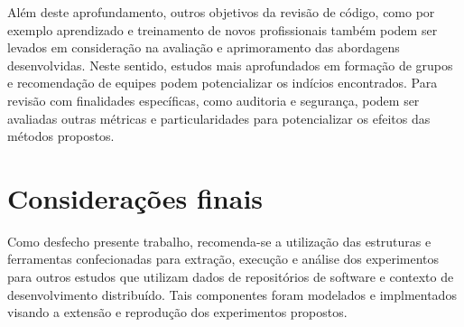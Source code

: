 \documentclass[12pt,openany,oneside,a4paper,english,brazil]{abntbibufjf}
\begin{document}
  Além deste aprofundamento, outros objetivos da revisão de código, como por exemplo aprendizado e treinamento de novos profissionais também podem ser levados em consideração na avaliação e aprimoramento das abordagens desenvolvidas. Neste sentido, estudos mais aprofundados em formação de grupos e recomendação de equipes podem potencializar os indícios encontrados. Para revisão com finalidades específicas, como auditoria e segurança, podem ser avaliadas outras métricas e particularidades para potencializar os efeitos das métodos propostos.


  \section{Considerações finais}\label{sec:consideracoes_finais}
  Como desfecho presente trabalho, recomenda-se a utilização das estruturas e ferramentas confecionadas para extração, execução e análise dos experimentos para outros estudos que utilizam dados de repositórios de software e contexto de desenvolvimento distribuído. Tais componentes foram modelados e implmentados visando a extensão e reprodução dos experimentos propostos.





\postextual








\end{document}
